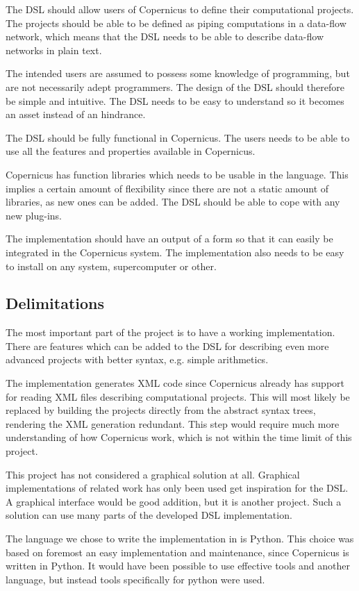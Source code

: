 The DSL should allow users of Copernicus to define their computational
projects. The projects should be able to be defined as piping
computations in a data-flow network, which means that the DSL needs to
be able to describe data-flow networks in plain text.

The intended users are assumed to possess some knowledge of
programming, but are not necessarily adept programmers. The design of
the DSL should therefore be simple and intuitive. The DSL needs to be
easy to understand so it becomes an asset instead of an hindrance.

The DSL should be fully functional in Copernicus. The users needs to
be able to use all the features and properties available in
Copernicus.

Copernicus has function libraries which needs to be usable in the
language. This implies a certain amount of flexibility since there are
not a static amount of libraries, as new ones can be added. The DSL
should be able to cope with any new plug-ins.

The implementation should have an output of a form so that it can
easily be integrated in the Copernicus system. The implementation
also needs to be easy to install on any system, supercomputer or
other.

\subsection{Delimitations}
The most important part of the project is to have a working
implementation. There are features which can be added to the DSL for
describing even more advanced projects with better syntax, e.g. simple
arithmetics.

The implementation generates XML code since Copernicus already has
support for reading XML files describing computational projects. This
will most likely be replaced by building the projects directly from
the abstract syntax trees, rendering the XML generation
redundant. This step would require much more understanding of how
Copernicus work, which is not within the time limit of this project.

This project has not considered a graphical solution at all. Graphical
implementations of related work has only been used get inspiration for
the DSL. A graphical interface would be good addition, but it is
another project. Such a solution can use many parts of the developed
DSL implementation.

The language we chose to write the implementation in is Python. This
choice was based on foremost an easy implementation and maintenance,
since Copernicus is written in Python. It would have been possible to
use effective tools and another language, but instead tools
specifically for python were used.


